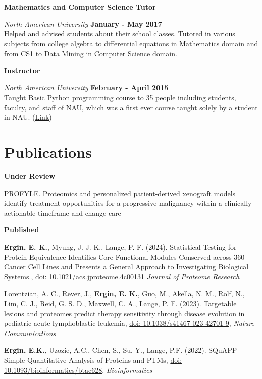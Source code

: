 \documentclass[margin,line]{res}
\begin{document}
\begin{resume}
{\bf Mathematics and Computer Science Tutor}
\vspace{-.1cm}

{\em North American University} \hfill {\bf January - May 2017}\\
Helped and advised students about their school classes. Tutored in various subjects from college algebra to differential equations in Mathematics domain and from CS1 to Data Mining in Computer Science domain.

{\bf Instructor}
\vspace{-.1cm}

{\em North American University} \hfill {\bf February - April 2015}\\
Taught Basic Python programming course to 35 people including students, faculty, and staff of NAU, which was a first ever course taught solely by a student in NAU. (\href{https://github.com/NAU-Python-Class/Py101-Spring-15}{Link})


\section{\sc Publications}
{\bf Under Review}

\vspace*{-.3cm}
PROFYLE. Proteomics and personalized patient-derived xenograft models identify treatment opportunities for a progressive malignancy within a clinically actionable timeframe and change care

{\bf Published}

\vspace*{-.3cm}

{\bf Ergin, E. K.}, Myung, J. J. K., Lange, P. F. (2024). Statistical Testing for Protein Equivalence Identifies Core Functional Modules Conserved across 360 Cancer Cell Lines and Presents a General Approach to Investigating Biological Systems., \href{https://doi.org/10.1021/acs.jproteome.4c00131}{doi: 10.1021/acs.jproteome.4c00131} {\em Journal of Proteome Research}

Lorentzian, A. C., Rever, J., {\bf Ergin, E. K.}, Guo, M., Akella, N. M., Rolf, N., Lim, C. J., Reid, G. S. D., Maxwell, C. A., Lange, P. F. (2023). Targetable lesions and proteomes predict therapy sensitivity through disease evolution in pediatric acute lymphoblastic leukemia, \href{https://doi.org/10.1038/s41467-023-42701-9}{doi: 10.1038/s41467-023-42701-9}, {\em Nature Communications}

{\bf Ergin, E.K.}, Uzozie, A.C., Chen, S., Su, Y., Lange, P.F. (2022). SQuAPP - Simple Quantitative Analysis of Proteins and PTMs, \href{https://doi.org/10.1093/bioinformatics/btac628}{doi: 10.1093/bioinformatics/btac628}, {\em Bioinformatics}


\end{resume}
\end{document}
